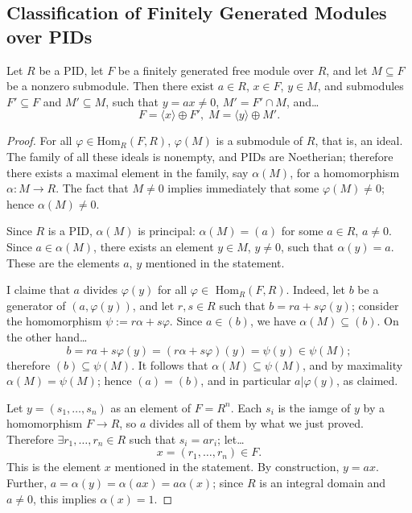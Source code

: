 \subsection{Classification of Finitely Generated Modules over PIDs}\label{moduleclassification}

\begin{lemma}
Let $R$ be a PID, let $F$ be a finitely generated free module over $R$, and let $M \subseteq F$ be a nonzero submodule. Then
there exist $a \in R$, $x \in F$, $y \in M$, and submodules $F' \subseteq F$ and $M' \subseteq M$, such that $y = ax \neq 0$,
$M' = F' \cap M$, and\dots
$$F = \langle x \rangle \oplus F', \; M = \langle y \rangle \oplus M'.$$
\end{lemma}

\begin{proof}
For all $\varphi \in \textrm{Hom}_R(F,R)$, $\varphi(M)$ is a submodule of $R$, that is, an ideal. The family of all these ideals
is nonempty, and PIDs are Noetherian; therefore there exists a maximal element in the family, say $\alpha(M)$, for a homomorphism
$\alpha : M \rightarrow R$. The fact that $M \neq 0$ implies immediately that some $\varphi(M) \neq 0$; hence $\alpha(M) \neq 0$.

Since $R$ is a PID, $\alpha(M)$ is principal: $\alpha(M) = (a)$ for some $a \in R$, $a \neq 0$. Since $a \in \alpha(M)$, there exists
an element $y \in M$, $y \neq 0$, such that $\alpha(y) = a$. These are the elements $a$, $y$ mentioned in the statement.

I claime that $a$ divides $\varphi(y)$ for all $\varphi \in$ Hom$_R(F,R)$. Indeed, let $b$ be a generator of $(a, \varphi(y))$, and let
$r,s \in R$ such that $b = ra + s \varphi(y)$; consider the homomorphism $\psi := r\alpha + s\varphi$. Since $a \in (b)$, we have $\alpha(M) \subseteq (b)$.
On the other hand\dots
$$b = ra + s \varphi(y) = (r\alpha + s\varphi)(y) = \psi(y) \in \psi(M);$$
therefore $(b) \subseteq \psi(M)$. It follows that $\alpha(M) \subseteq \psi(M)$, and by maximality $\alpha(M) = \psi(M)$; hence $(a) = (b)$, and in particular
$a | \varphi(y)$, as claimed.

Let $y = (s_1, \dots, s_n)$ as an element of $F = R^n$. Each $s_i$ is the iamge of $y$ by a homomorphism $F \rightarrow R$, so $a$ divides all of them by what we
just proved. Therefore $\exists r_1, \dots, r_n \in R$ such that $s_i = a r_i$; let\dots
$$x = (r_1, \dots, r_n) \in F.$$
This is the element $x$ mentioned in the statement. By construction, $y = ax$. Further, $a = \alpha(y) = \alpha(ax) = a\alpha(x)$; since $R$ is an integral domain and
$a \neq 0$, this implies $\alpha(x) = 1$.


\end{proof}
